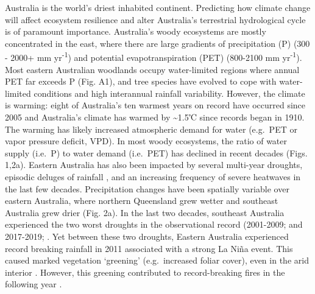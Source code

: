 \documentclass[gc, manuscript]{copernicus}
\begin{document}
\introduction[Introduction]

Australia is the world's driest inhabited continent. Predicting how
climate change will affect ecosystem resilience and alter Australia's
terrestrial hydrological cycle is of paramount importance. Australia's
woody ecosystems are mostly concentrated in the east, where there are
large gradients of precipitation (P) (300 - 2000+ mm
yr\textsuperscript{-1}) and potential evapotranspiration (PET) (800-2100
mm yr\textsuperscript{-1}). Most eastern Australian woodlands occupy
water-limited regions where annual PET far exceeds P (Fig. A1), and tree
species have evolved to cope with water-limited conditions
\citep{petersLivingEdgeContinentalscale2021} and high interannual
rainfall variability. However, the climate is warming: eight of
Australia's ten warmest years on record have occurred since 2005
\citep{csiroStateClimate20202020} and Australia's climate has warmed by
\textasciitilde1.5℃ since records began in 1910. The warming has likely
increased atmospheric demand for water (e.g.~PET or vapor pressure
deficit, VPD). In most woody ecosystems, the ratio of water supply
(i.e.~P) to water demand (i.e.~PET) has declined in recent decades
(Figs. 1,2a). Eastern Australia has also been impacted by several
multi-year droughts, episodic deluges of rainfall
\citep{kingRoleClimateVariability2020b}, and an increasing frequency of
severe heatwaves \citep{perkinsIncreasingFrequencyIntensity2012a} in the
last few decades. Precipitation changes have been spatially variable
over eastern Australia, where northern Queensland grew wetter and
southeast Australia grew drier (Fig. 2a). In the last two decades,
southeast Australia experienced the two worst droughts in the
observational record (2001-2009;
\citet{vandijkMillenniumDroughtSoutheast2013d} and 2017-2019;
\citep{bureauofmeteorologyAnnualAustralianClimate}. Yet between these
two droughts, Eastern Australia experienced record breaking rainfall in
2011 associated with a strong La Niña event. This caused marked
vegetation `greening' (e.g.~increased foliar cover), even in the arid
interior
\citep{bastosGlobalNPPDependence2013a, poulterContributionSemiaridEcosystems2014, ahlstromDominantRoleSemiarid2015a}.
However, this greening contributed to record-breaking fires in the
following year \citep{harrisBiologicalResponsesPress2018b}.
\end{document}
